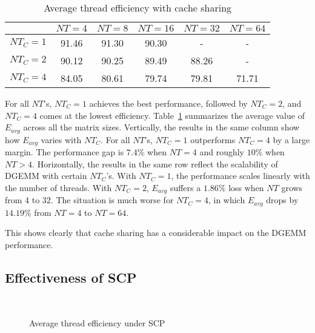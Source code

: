 \begin{table}
  \centering
  \caption{Average thread efficiency with cache sharing}
  \label{tab:drawback}
  \begin{tabular}{cccccc}
    \toprule
     & $NT=4$ & $NT=8$ & $NT=16$ & $NT=32$ & $NT=64$ \\
    \midrule
    $NT_C=1$ & 91.46 & 91.30 & 90.30 & -     & - \\   
    $NT_C=2$ & 90.12 & 90.25 & 89.49 & 88.26 & - \\
    $NT_C=4$ & 84.05 & 80.61 & 79.74 & 79.81 & 71.71 \\
    \bottomrule
  \end{tabular}
\end{table}

For all $NT$'s, $NT_C=1$ achieves the 
best performance, followed by 
$NT_C=2$, and $NT_C=4$ comes at the lowest efficiency.
Table~\ref{tab:drawback} summarizes the average value
of $E_{avg}$ across all the matrix sizes.
Vertically, the results in the same column show how $E_{avg}$ varies with $NT_C$.
For all $NT$'s, $NT_C=1$ outperforms $NT_C=4$ by a large margin.
The performance gap is $7.4\%$ when $NT=4$ and roughly $10\%$ when $NT>4$.
Horizontally,  the results in the same row reflect the scalability of
DGEMM with certain $NT_C$'s.
With $NT_C=1$, the performance scales linearly with the number of threads.
With $NT_C=2$, $E_{avg}$ suffers a $1.86\%$ loss when $NT$ grows from 4 to 32.
The situation is much worse for $NT_C=4$, in which
$E_{avg}$ drops by $14.19\%$ from
$NT=4$ to $NT=64$.

This shows clearly that cache sharing has a considerable
impact on the DGEMM performance. 

\subsection{Effectiveness of SCP}\label{subsec:benefit}

\begin{figure}
  \centering
  \\
  \caption{Average thread efficiency under SCP}
  \label{fig:benefit}
\end{figure}

